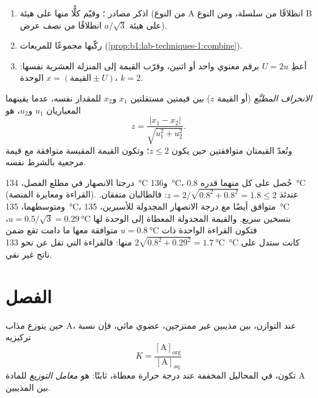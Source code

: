 \begin{method}\label{met:b1:lab-techniques-1:report-result}
\begin{enumerate}
  \item اذكر مصادر ؛ وقيّم كلًّا منها على هيئة  (من النوع A انطلاقًا من سلسلة، ومن النوع B على هيئة $a/\sqrt3$ انطلاقًا من
        نصف عرض).
  \item ركّبها مجموعًا للمربعات (\cref{prop:b1:lab-techniques-1:combine}).
  \item أعطِ  $U = 2u$ برقم معنوي واحد أو اثنين،
        وقرّب القيمة إلى المنزلة العشرية
        نفسها: $x = (\text{القيمة} \pm U)$ الوحدة، $k = 2$.
\end{enumerate}
\end{method}

\begin{definition}\label{def:b1:lab-techniques-1:z-score}
\emph{الانحراف المطبَّع} (أو القيمة $z$)
بين قيمتين مستقلتين $x_1$ و$x_2$ للمقدار نفسه،
عدما يقينهما المعياريان $u_1$ و$u_2$، هو
\[
  z = \frac{|x_1 - x_2|}{\sqrt{u_1^2 + u_2^2}} .
\]
وتُعدّ القيمتان متوافقتين حين يكون $z \le 2$؛ وتكون القيمة المقيسة
متوافقة مع قيمة مرجعية بالشرط نفسه.
\end{definition}

\begin{example}[الطالبان]
درجتا الانصهار في مطلع الفصل، \qty{134}{\celsius}
و\qty{136}{\celsius}، حُصل على كل منهما  قدره
\qty{0.8}{\celsius} (القراءة ومعايرة المنصة). عندئذ
$z = 2/\sqrt{0.8^2 + 0.8^2} = 1.8 \le 2$: فالطالبان متفقان. ومتوسطهما،
\qty{135}{\celsius}، متوافق أيضًا مع درجة الانصهار المجدولة
للأسبرين، \qty{135}{\celsius} بتسخين سريع. والقيمة المجدولة
المعطاة إلى الوحدة لها $u = 0.5/\sqrt3 = \qty{0.29}{\celsius}$، فتكون القراءة
الواحدة ذات $u = \qty{0.8}{\celsius}$ متوافقة معها ما دامت تقع
ضمن $2\sqrt{0.8^2 + 0.29^2} = \qty{1.7}{\celsius}$ منها: فالقراءة
التي تقل عن نحو \qty{133}{\celsius} كانت ستدل على ناتج غير نقي.
\end{example}

\section{الفصل}

\begin{definition}\label{def:b1:lab-techniques-1:partition-coefficient}
حين يتوزع مذاب A، عند التوازن، بين مذيبين
غير ممتزجين،  عضوي  مائي، فإن نسبة
تركيزيه
\[
  K = \frac{[\mathrm{A}]_{\mathrm{org}}}{[\mathrm{A}]_{\mathrm{aq}}}
\]
تكون، في المحاليل المخففة عند درجة حرارة معطاة، ثابتًا: هو
\emph{معامل التوزيع} للمادة A بين
المذيبين.
\end{definition}

